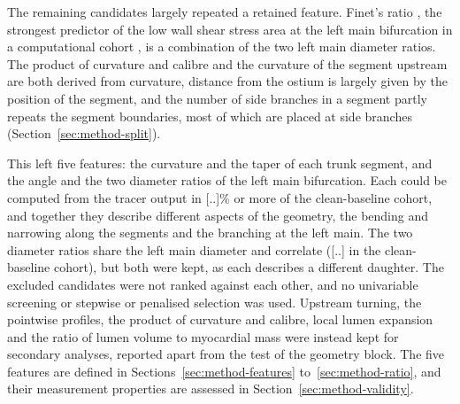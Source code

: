 The remaining candidates largely repeated a retained feature.
Finet's ratio \cite{finet2008fractal}, the strongest predictor of the low wall shear stress area at the left main bifurcation in a computational cohort \cite{gharleghi2024leftmain}, is a combination of the two left main diameter ratios.
The product of curvature and calibre and the curvature of the segment upstream are both derived from curvature, distance from the ostium is largely given by the position of the segment, and the number of side branches in a segment partly repeats the segment boundaries, most of which are placed at side branches (Section~\ref{sec:method-split}).

This left five features: the curvature and the taper of each trunk segment, and the angle and the two diameter ratios of the left main bifurcation.
Each could be computed from the tracer output in [..]\% or more of the clean-baseline cohort, and together they describe different aspects of the geometry, the bending and narrowing along the segments and the branching at the left main.
The two diameter ratios share the left main diameter and correlate ([..] in the clean-baseline cohort), but both were kept, as each describes a different daughter.
The excluded candidates were not ranked against each other, and no univariable screening or stepwise or penalised selection was used.
Upstream turning, the pointwise profiles, the product of curvature and calibre, local lumen expansion and the ratio of lumen volume to myocardial mass were instead kept for secondary analyses, reported apart from the test of the geometry block.
The five features are defined in Sections~\ref{sec:method-features} to~\ref{sec:method-ratio}, and their measurement properties are assessed in Section~\ref{sec:method-validity}.

